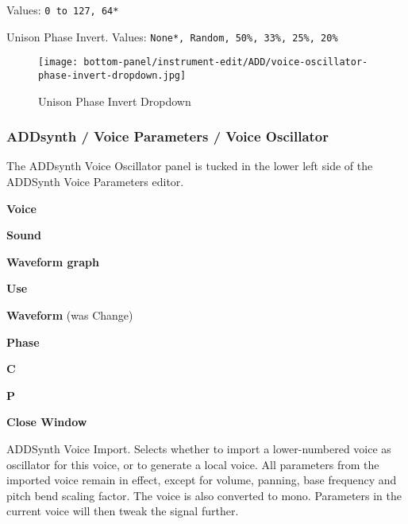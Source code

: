    Values: \texttt{0 to 127, 64*}

   Unison Phase Invert.
   Values: \texttt{None*, Random, 50\%, 33\%, 25\%, 20\%}

\begin{figure}[H]
   \centering
   \texttt{[image: bottom-panel/instrument-edit/ADD/voice-oscillator-phase-invert-dropdown.jpg]}
   \caption{Unison Phase Invert Dropdown}
   \label{fig:phase_invert_dropdown}
\end{figure}


\subsubsection{ADDsynth / Voice Parameters / Voice Oscillator}
\label{subsubsec:addsynth_voice_parameters_oscillator}

   The ADDsynth Voice Oscillator panel is tucked in the lower left side of the
   ADDSynth Voice Parameters editor.


   \begin{enumber}
     \item \textbf{Voice}
      \item \textbf{Sound}
      \item \textbf{Waveform graph}
      \item \textbf{Use}
      \item \textbf{Waveform} (was Change)
      \item \textbf{Phase}
      \item \textbf{C}
      \item \textbf{P}
      \item \textbf{Close Window}
   \end{enumber}


   \setcounter{ItemCounter}{0}      %


  ADDSynth Voice Import. Selects whether to import a lower-numbered voice as
  oscillator for this voice, or to generate a local voice. All parameters from
  the imported voice remain in effect, except for volume, panning, base
  frequency and pitch bend scaling factor. The voice is also converted to mono.
  Parameters in the current voice will then tweak the signal further.

